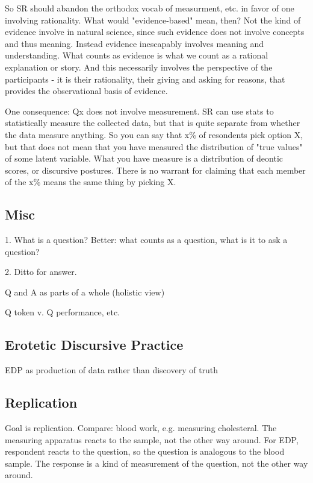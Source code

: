 \documentclass[11pt,twoside]{article}
\begin{document}
So SR should abandon the orthodox vocab of measurment, etc. in favor
of one involving rationality.  What would "evidence-based" mean, then?
Not the kind of evidence involve in natural science, since such
evidence does not involve concepts and thus meaning.  Instead evidence
inescapably involves meaning and understanding.  What counts as
evidence is what we count as a rational explanation or story.  And
this necessarily involves the perspective of the participants - it is
their rationality, their giving and asking for reasons, that provides
the observational basis of evidence.

 One consequence: Qx does not involve measurement.  SR can use stats
 to statistically measure the collected data, but that is quite
 separate from whether the data measure anything.  So you can say that
 x\% of resondents pick option X, but that does not mean that you have
 measured the distribution of "true values" of some latent variable.
 What you have measure is a distribution of deontic scores, or
 discursive postures.  There is no warrant for claiming that each
 member of the x\% means the same thing by picking X.

\subsection{Misc}

1.  What is a question?  Better: what counts as a question, what is it to ask a question?

2.  Ditto for answer.

Q and A as parts of a whole (holistic view)

Q token v. Q performance, etc.

\subsection{Erotetic Discursive Practice}


EDP as production of data rather than discovery of truth

\subsection{Replication}

Goal is replication.  Compare: blood work, e.g. measuring
cholesteral.  The measuring apparatus reacts to the sample, not the
other way around.  For EDP, respondent reacts to the question, so the
question is analogous to the blood sample.  The response is a kind of
measurement of the question, not the other way around.
\end{document}
